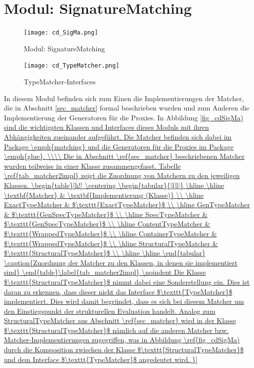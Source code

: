\section{Modul: SignatureMatching}
\begin{figure}
\texttt{[image: cd\_SigMa.png]}
\caption{Modul: SignatureMatching}
\label{fig_cdSigMa}
\end{figure}
\begin{figure}
\texttt{[image: cd\_TypeMatcher.png]}
\caption{TypeMatcher-Interfaces}
\label{fig_cdTypeMatcher}
\end{figure}
In diesem Modul befinden sich zum Einen die Implementierungen der Matcher, die in Abschnitt \ref{sec_matcher} formal beschrieben wurden und zum Anderen die Implementierung der Generatoren für die Proxies. In Abbildung \ref{fig_cdSigMa) sind die wichtigsten Klassen und Interfaces dieses Moduls mit ihren Abhängigkeiten zueinander aufgeführt. Die Matcher befinden sich dabei im Package \emph{matching} und die Generatoren für die Proxies im Package \emph{glue}.
\\\\
Die in Abschnitt \ref{sec_matcher} beschriebenen Matcher wurden teilweise in einer Klasse zusammengefasst. Tabelle \ref{tab_matcher2impl} zeigt die Zuordnung von Matchern zu den jeweiligen Klassen.
\begin{table}[h!]
\centering
\begin{tabular}{|l|l|}
\hline
\hline
\textbf{Matcher} & \textbf{Implementierung (Klasse)} \\
\hline
ExactTypeMatcher & $\texttt{ExactTypeMatcher}$ \\
\hline
GenTypeMatcher & $\texttt{GenSpecTypeMatcher}$ \\
\hline
SpecTypeMatcher & $\texttt{GenSpecTypeMatcher}$ \\
\hline
ContentTypeMatcher & $\texttt{WrappedTypeMatcher}$ \\
\hline
ContainerTypeMatcher & $\texttt{WrappedTypeMatcher}$ \\
\hline
StructuralTypeMatcher & $\texttt{StructuralTypeMatcher}$ \\
\hline
\hline
\end{tabular}
\caption{Zuordnung der Matcher zu den Klassen, in denen sie implementiert sind}
\end{table}\label{tab_matcher2impl}
\noindent
Die Klasse $\texttt{StructuralTypeMatcher}$ nimmt dabei eine Sonderstellung ein. Dies ist daran zu erkennen, dass dieser nicht das Interface $\texttt{TypeMatcher}$ implementiert. Dies wird damit begründet, dass es sich bei diesem Matcher um den Einstiegspunkt der strukturellen Evaluation handelt. Analog zum StructuralTypeMatcher aus Abschnitt \ref{sec_matcher} wird in der Klasse $\texttt{StructuralTypeMatcher}$ nämlich auf die anderen Matcher bzw. Matcher-Implementierungen zugegriffen, was in Abbildung \ref{fig_cdSigMa) durch die Komposition zwischen der Klasse $\texttt{StructuralTypeMatcher}$ und dem Interface $\texttt{TypeMatcher}$ angedeutet wird.
}}
